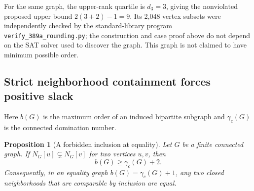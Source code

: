 \documentclass[11pt,a4paper]{article}
\newtheorem{proposition}[theorem]{Proposition}
\theoremstyle{definition}\newtheorem{definition}[theorem]{Definition}
\theoremstyle{remark}\newtheorem{remark}[theorem]{Remark}
\begin{document}
For the same graph, the upper-rank quartile is $d_3=3$, giving the
nonviolated proposed upper bound $2(3+2)-1=9$. Its 2,048 vertex
subsets were independently checked by the standard-library program
\texttt{verify\_389a\_rounding.py}; the construction and case proof
above do not depend on the SAT solver used to discover the graph.
This graph is not claimed to have minimum possible order.


\subsection{Strict neighborhood containment forces positive slack}
\label{post22:strict-containment}
Here $b(G)$ is the maximum order of an induced bipartite subgraph and
$\gamma_c(G)$ is the connected domination number.

\begin{proposition}[A forbidden inclusion at equality]
\label{post22:strict-neighborhood}
Let $G$ be a finite connected graph. If
$N_G[u]\subsetneq N_G[v]$ for two vertices $u,v$, then
\[
 b(G)\ge\gamma_c(G)+2.
\]
Consequently, in an equality graph $b(G)=\gamma_c(G)+1$, any two
closed neighborhoods that are comparable by inclusion are equal.
\end{proposition}
\end{document}
